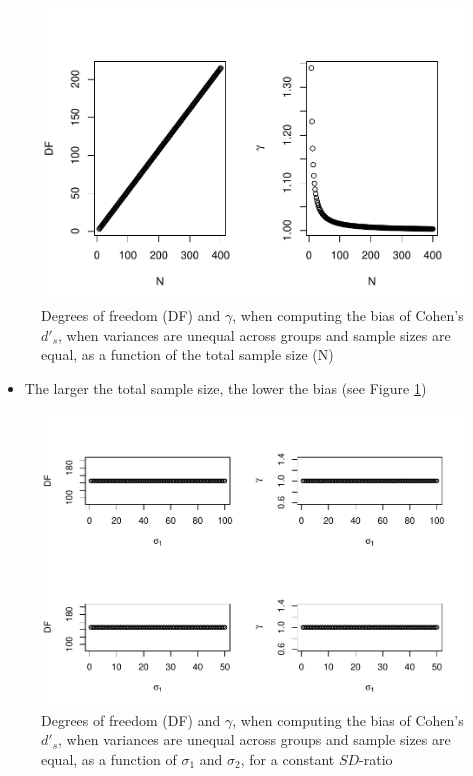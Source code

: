 \documentclass[
  man]{apa6}
\providecommand{\tightlist}{%
  \setlength{\itemsep}{0pt}\setlength{\parskip}{0pt}}
\begin{document}
\begin{figure}
\centering
\includegraphics{Theoretical-Bias-of-all-estimators-as-a-function-of-population-parameters_files/figure-latex/biascohendprimehetbalNsize2-1.pdf}
\caption{\label{fig:biascohendprimehetbalNsize2}Degrees of freedom (DF) and \(\gamma\), when computing the bias of Cohen's \(d'_s\), when variances are unequal across groups and sample sizes are equal, as a function of the total sample size (N)}
\end{figure}

\begin{itemize}
\tightlist
\item
  The larger the total sample size, the lower the bias (see Figure \ref{fig:biascohendprimehetbalNsize2})
\end{itemize}

\begin{figure}
\centering
\includegraphics{Theoretical-Bias-of-all-estimators-as-a-function-of-population-parameters_files/figure-latex/biascohendprimehetbalvariance2-1.pdf}
\caption{\label{fig:biascohendprimehetbalvariance2}Degrees of freedom (DF) and \(\gamma\), when computing the bias of Cohen's \(d'_s\), when variances are unequal across groups and sample sizes are equal, as a function of \(\sigma_1\) and \(\sigma_2\), for a constant \(SD\)-ratio}
\end{figure}
\end{document}
